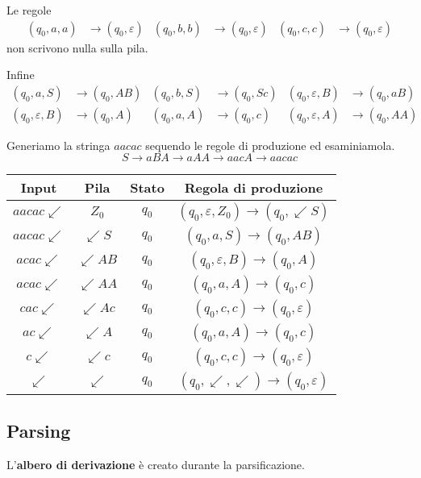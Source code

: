 \documentclass[11pt]{article}
\begin{document}
Le regole
\begin{align*}
    (q_0,a,a)&\rightarrow(q_0,\varepsilon) & (q_0,b,b)&\rightarrow(q_0,\varepsilon) & (q_0,c,c)&\rightarrow(q_0,\varepsilon)
\end{align*}
non scrivono nulla sulla pila. 

Infine
\begin{align*}
    (q_0,a,S)&\rightarrow(q_0,AB) & (q_0,b,S)&\rightarrow(q_0,Sc) & (q_0,\varepsilon,B)&\rightarrow(q_0,aB)\\
    (q_0,\varepsilon,B)&\rightarrow(q_0,A) & (q_0,a,A)&\rightarrow(q_0,c) & (q_0,\varepsilon,A)&\rightarrow(q_0,AA)
\end{align*}

Generiamo la stringa $aacac$ sequendo le regole di produzione ed esaminiamola.
\begin{equation*}
    S\rightarrow aBA\rightarrow aAA \rightarrow aacA \rightarrow aacac
\end{equation*}
\begin{center}
    \begin{tabular}{ |c|c|c|c| }
     \hline
     Input & Pila & Stato & Regola di produzione \\ 
     \hline\hline
     $aacac\swarrow$ & $Z_0$ & $q_0$ & $(q_0,\varepsilon,Z_0)\rightarrow(q_0,\swarrow S)$ \\ 
     $aacac\swarrow$ & $\swarrow S$ & $q_0$ & $(q_0,a,S)\rightarrow(q_0,AB)$ \\ 
     $acac\swarrow$ & $\swarrow AB$ & $q_0$ &  $(q_0,\varepsilon,B)\rightarrow(q_0,A)$\\ 
     $acac\swarrow$ & $\swarrow AA$ & $q_0$ & $(q_0,a,A)\rightarrow(q_0,c)$ \\ 
     $cac\swarrow$ & $\swarrow Ac$ & $q_0$ &  $(q_0,c,c)\rightarrow(q_0,\varepsilon)$\\ 
     $ac\swarrow$ & $\swarrow A$ & $q_0$ & $(q_0,a,A)\rightarrow(q_0,c)$ \\ 
     $c\swarrow$ & $\swarrow c$ & $q_0$ & $(q_0,c,c)\rightarrow(q_0,\varepsilon)$ \\
     $\swarrow$ & $\swarrow$ & $q_0$ & $(q_0,\swarrow,\swarrow)\rightarrow(q_0,\varepsilon)$ \\ 
     \hline
    \end{tabular}
\end{center}
\subsection{Parsing}
L'\textbf{albero di derivazione} è creato durante la parsificazione. 
\end{document}

